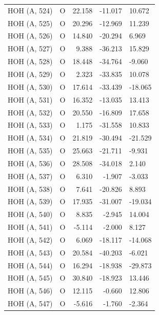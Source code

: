\begin{longtable}{@{}lcrr@{}}
  \cmidrule(r){1-5}
  HOH (A, 524) & O & 22.158 & -11.017 & 10.672 \\
  \cmidrule(r){1-5}
  HOH (A, 525) & O & 20.296 & -12.969 & 11.239 \\
  \cmidrule(r){1-5}
  HOH (A, 526) & O & 14.840 & -20.294 & 6.969 \\
  \cmidrule(r){1-5}
  HOH (A, 527) & O & 9.388 & -36.213 & 15.829 \\
  \cmidrule(r){1-5}
  HOH (A, 528) & O & 18.448 & -34.764 & -9.060 \\
  \cmidrule(r){1-5}
  HOH (A, 529) & O & 2.323 & -33.835 & 10.078 \\
  \cmidrule(r){1-5}
  HOH (A, 530) & O & 17.614 & -33.439 & -18.065 \\
  \cmidrule(r){1-5}
  HOH (A, 531) & O & 16.352 & -13.035 & 13.413 \\
  \cmidrule(r){1-5}
  HOH (A, 532) & O & 20.550 & -16.809 & 17.658 \\
  \cmidrule(r){1-5}
  HOH (A, 533) & O & 1.175 & -31.558 & 10.833 \\
  \cmidrule(r){1-5}
  HOH (A, 534) & O & 21.819 & -30.494 & -21.529 \\
  \cmidrule(r){1-5}
  HOH (A, 535) & O & 25.663 & -21.711 & -9.931 \\
  \cmidrule(r){1-5}
  HOH (A, 536) & O & 28.508 & -34.018 & 2.140 \\
  \cmidrule(r){1-5}
  HOH (A, 537) & O & 6.310 & -1.907 & -3.033 \\
  \cmidrule(r){1-5}
  HOH (A, 538) & O & 7.641 & -20.826 & 8.893 \\
  \cmidrule(r){1-5}
  HOH (A, 539) & O & 17.935 & -31.007 & -19.034 \\
  \cmidrule(r){1-5}
  HOH (A, 540) & O & 8.835 & -2.945 & 14.004 \\
  \cmidrule(r){1-5}
  HOH (A, 541) & O & -5.114 & -2.000 & 8.127 \\
  \cmidrule(r){1-5}
  HOH (A, 542) & O & 6.069 & -18.117 & -14.068 \\
  \cmidrule(r){1-5}
  HOH (A, 543) & O & 20.584 & -40.203 & -6.021 \\
  \cmidrule(r){1-5}
  HOH (A, 544) & O & 16.294 & -18.938 & -29.873 \\
  \cmidrule(r){1-5}
  HOH (A, 545) & O & 30.840 & -18.923 & 13.446 \\
  \cmidrule(r){1-5}
  HOH (A, 546) & O & 12.115 & -0.660 & 12.806 \\
  \cmidrule(r){1-5}
  HOH (A, 547) & O & -5.616 & -1.760 & -2.364 \\

\end{longtable}
